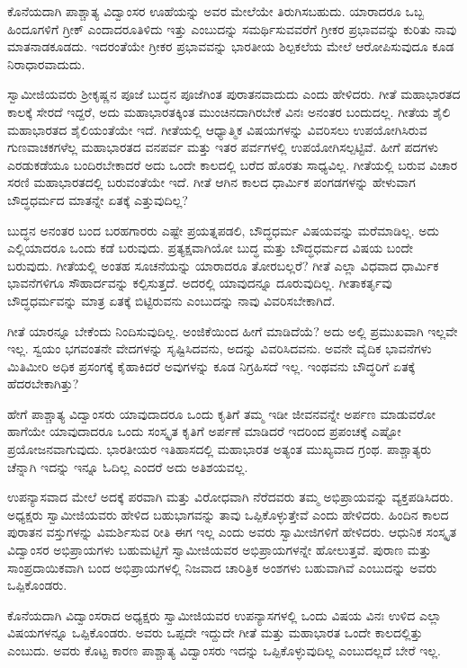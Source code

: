  ಕೊನೆಯದಾಗಿ ಪಾಶ್ಚಾತ್ಯ ವಿದ್ವಾಂಸರ ಊಹೆಯನ್ನು ಅವರ ಮೇಲೆಯೇ ತಿರುಗಿಸಬಹುದು. ಯಾರಾದರೂ ಒಬ್ಬ ಹಿಂದೂಗಳಿಗೆ ಗ್ರೀಕ್ ಎಂದಾದರೂ‌ತಿಳಿದು ಇತ್ತು ಎಂಬುದನ್ನು ಸಮರ್ಥಿಸುವವರೆಗೆ ಗ್ರೀಕರ ಪ್ರಭಾವವನ್ನು ಕುರಿತು ನಾವು ಮಾತನಾಡಕೂಡದು. ಇದರಂತೆಯೇ ಗ್ರೀಕರ ಪ್ರಭಾವವನ್ನು ಭಾರತೀಯ ಶಿಲ್ಪಕಲೆಯ ಮೇಲೆ ಆರೋಪಿಸುವುದೂ ಕೂಡ ನಿರಾಧಾರವಾದುದು. 

 ಸ್ವಾಮೀಜಿಯವರು ಶ‍್ರೀಕೃಷ್ಣನ ಪೂಜೆ ಬುದ್ಧನ ಪೂಜೆಗಿಂತ ಪುರಾತನವಾದುದು ಎಂದು ಹೇಳಿದರು. ಗೀತೆ ಮಹಾಭಾರತದ ಕಾಲಕ್ಕೆ ಸೇರದೆ ಇದ್ದರೆ, ಅದು ಮಹಾಭಾರತಕ್ಕಿಂತ ಮುಂಚಿನದಾಗಿರಬೇಕೆ ವಿನಃ ಅನಂತರ ಬಂದುದಲ್ಲ. ಗೀತೆಯ ಶೈಲಿ ಮಹಾಭಾರತದ ಶೈಲಿಯಂತೆಯೇ ಇದೆ. ಗೀತೆಯಲ್ಲಿ ಆಧ್ಯಾತ್ಮಿಕ ವಿಷಯಗಳನ್ನು ವಿವರಿಸಲು ಉಪಯೋಗಿಸಿರುವ ಗುಣವಾಚಕಗಳೆಲ್ಲ ಮಹಾಭಾರತದ ವನಪರ್ವ ಮತ್ತು ಇತರ ಪರ್ವಗಳಲ್ಲಿ ಉಪಯೋಗಿಸಲ್ಪಟ್ಟಿವೆ. ಹೀಗೆ ಪದಗಳು ಎರಡುಕಡೆಯೂ ಬಂದಿರಬೇಕಾದರೆ ಅದು ಒಂದೇ ಕಾಲದಲ್ಲಿ ಬರೆದ ಹೊರತು ಸಾಧ್ಯವಿಲ್ಲ. ಗೀತೆಯಲ್ಲಿ ಬರುವ ವಿಚಾರ ಸರಣಿ ಮಹಾಭಾರತದಲ್ಲಿ ಬರುವಂತೆಯೇ ಇದೆ. ಗೀತೆ ಆಗಿನ ಕಾಲದ ಧಾರ್ಮಿಕ ಪಂಗಡಗಳನ್ನು ಹೇಳುವಾಗ ಬೌದ್ಧಧರ್ಮದ ಮಾತನ್ನೇ ಏತಕ್ಕೆ ಎತ್ತುವುದಿಲ್ಲ? 

 ಬುದ್ಧನ ಅನಂತರ ಬಂದ ಬರಹಗಾರರು ಎಷ್ಟೇ ಪ್ರಯತ್ನಪಡಲಿ, ಬೌದ್ಧಧರ್ಮ ವಿಷಯವನ್ನು ಮರೆಮಾಡಿಲ್ಲ. ಅದು ಎಲ್ಲಿಯಾದರೂ ಒಂದು ಕಡೆ ಬರುವುದು. ಪ್ರತ್ಯಕ್ಷವಾಗಿಯೋ ಬುದ್ಧ ಮತ್ತು ಬೌದ್ಧಧರ್ಮದ ವಿಷಯ ಬಂದೇ ಬರುವುದು. ಗೀತೆಯಲ್ಲಿ ಅಂತಹ ಸೂಚನೆಯನ್ನು ಯಾರಾದರೂ ತೋರಬಲ್ಲರೆ? ಗೀತೆ ಎಲ್ಲಾ ವಿಧವಾದ ಧಾರ್ಮಿಕ ಭಾವನೆಗಳಿಗೂ ಸೌಹಾರ್ದವನ್ನು ಕಲ್ಪಿಸುತ್ತದೆ. ಅದರಲ್ಲಿ ಯಾವುದನ್ನೂ ದೂರುವುದಿಲ್ಲ. ಗೀತಾಕರ್ತೃವು ಬೌದ್ಧಧರ್ಮವನ್ನು ಮಾತ್ರ ಏತಕ್ಕೆ ಬಿಟ್ಟಿರುವನು ಎಂಬುದನ್ನು ನಾವು ವಿವರಿಸಬೇಕಾಗಿದೆ.

 ಗೀತೆ ಯಾರನ್ನೂ ಬೇಕೆಂದು ನಿಂದಿಸುವುದಿಲ್ಲ. ಅಂಜಿಕೆಯಿಂದ ಹೀಗೆ ಮಾಡಿದೆಯೆ? ಅದು ಅಲ್ಲಿ ಪ್ರಮುಖವಾಗಿ ಇಲ್ಲವೇ ಇಲ್ಲ. ಸ್ವಯಂ ಭಗವಂತನೇ ವೇದಗಳನ್ನು ಸೃಷ್ಟಿಸಿದವನು, ಅದನ್ನು ವಿವರಿಸಿದವನು. ಅವನೇ ವೈದಿಕ ಭಾವನೆಗಳು ಮಿತಿಮೀರಿ ಅಧಿಕ ಪ್ರಸಂಗಕ್ಕೆ ಕೈಹಾಕಿದರೆ ಅವುಗಳನ್ನು ಕೂಡ ನಿಗ್ರಹಿಸದೆ ಇಲ್ಲ. ಇಂಥವನು ಬೌದ್ಧರಿಗೆ ಏತಕ್ಕೆ ಹೆದರಬೇಕಾಗಿತ್ತು? 

 ಹೇಗೆ ಪಾಶ್ಚಾತ್ಯ ವಿದ್ವಾಂಸರು ಯಾವುದಾದರೂ ಒಂದು ಕೃತಿಗೆ ತಮ್ಮ ಇಡೀ ಜೀವನವನ್ನೇ ಅರ್ಪಣ ಮಾಡುವರೋ ಹಾಗೆಯೇ ಯಾವುದಾದರೂ ಒಂದು ಸಂಸ್ಕೃತ ಕೃತಿಗೆ ಅರ್ಪಣೆ ಮಾಡಿದರೆ ಇದರಿಂದ ಪ್ರಪಂಚಕ್ಕೆ ಎಷ್ಟೋ ಪ್ರಯೋಜನವಾಗುವುದು. ಭಾರತೀಯರ ಇತಿಹಾಸದಲ್ಲಿ ಮಹಾಭಾರತ ಅತ್ಯಂತ ಮುಖ್ಯವಾದ ಗ್ರಂಥ. ಪಾಶ್ಚಾತ್ಯರು ಚೆನ್ನಾಗಿ ಇದನ್ನು ಇನ್ನೂ ಓದಿಲ್ಲ ಎಂದರೆ ಅದು ಅತಿಶಯವಲ್ಲ. 

 ಉಪನ್ಯಾಸವಾದ ಮೇಲೆ ಅದಕ್ಕೆ ಪರವಾಗಿ ಮತ್ತು ವಿರೋಧವಾಗಿ ನೆರೆದವರು ತಮ್ಮ ಅಭಿಪ್ರಾಯವನ್ನು ವ್ಯಕ್ತಪಡಿಸಿದರು. ಅಧ್ಯಕ್ಷರು ಸ್ವಾಮೀಜಿಯವರು ಹೇಳಿದ ಬಹುಭಾಗವನ್ನು ತಾವು ಒಪ್ಪಿಕೊಳ್ಳುತ್ತೇವೆ ಎಂದು ಹೇಳಿದರು. ಹಿಂದಿನ ಕಾಲದ ಪುರಾತನ ವಸ್ತುಗಳನ್ನು ವಿಮರ್ಶಿಸುವ ರೀತಿ ಈಗ ಇಲ್ಲ ಎಂದು ಅವರು ಸ್ವಾಮೀಜಿಗಳಿಗೆ ಹೇಳಿದರು. ಆಧುನಿಕ ಸಂಸ್ಕೃತ ವಿದ್ವಾಂಸರ ಅಭಿಪ್ರಾಯಗಳು ಬಹುಮಟ್ಟಿಗೆ ಸ್ವಾಮೀಜಿಯವರ ಅಭಿಪ್ರಾಯಗಳನ್ನೇ ಹೋಲುತ್ತವೆ. ಪುರಾಣ ಮತ್ತು ಸಾಂಪ್ರದಾಯಿಕವಾಗಿ ಬಂದ ಅಭಿಪ್ರಾಯಗಳಲ್ಲಿ ನಿಜವಾದ ಚಾರಿತ್ರಿಕ ಅಂಶಗಳು ಬಹುವಾಗಿವೆ ಎಂಬುದನ್ನು ಅವರು ಒಪ್ಪಿಕೊಂಡರು. 

 ಕೊನೆಯದಾಗಿ ವಿದ್ವಾಂಸರಾದ ಅಧ್ಯಕ್ಷರು ಸ್ವಾಮೀಜಿಯವರ ಉಪನ್ಯಾಸಗಳಲ್ಲಿ ಒಂದು ವಿಷಯ ವಿನಃ ಉಳಿದ ಎಲ್ಲಾ ವಿಷಯಗಳನ್ನೂ ಒಪ್ಪಿಕೊಂಡರು. ಅವರು ಒಪ್ಪದೇ ಇದ್ದುದೇ ಗೀತೆ ಮತ್ತು ಮಹಾಭಾರತ ಒಂದೇ ಕಾಲದಲ್ಲಿತ್ತು ಎಂಬುದು. ಅವರು ಕೊಟ್ಟ ಕಾರಣ ಪಾಶ್ಚಾತ್ಯ ವಿದ್ವಾಂಸರು ಇದನ್ನು ಒಪ್ಪಿಕೊಳ್ಳುವುದಿಲ್ಲ ಎಂಬುದಲ್ಲದೆ ಬೇರೆ ಇಲ್ಲ. 

